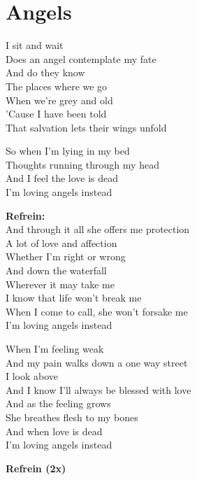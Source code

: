 \section{Angels}
I sit and wait\\
Does an angel contemplate my fate\\
And do they know\\
The places where we go\\
When we're grey and old\\
'Cause I have been told\\
That salvation lets their wings unfold

So when I'm lying in my bed\\
Thoughts running through my head\\
And I feel the love is dead\\
I'm loving angels instead

\textbf{Refrein:}\\
And through it all she offers me protection\\
A lot of love and affection\\
Whether I'm right or wrong\\
And down the waterfall\\
Wherever it may take me\\
I know that life won't break me\\
When I come to call, she won't forsake me\\
I'm loving angels instead

When I'm feeling weak\\
And my pain walks down a one way street\\
I look above\\
And I know I'll always be blessed with love\\
And as the feeling grows\\
She breathes flesh to my bones\\
And when love is dead\\
I'm loving angels instead

\textbf{Refrein (2x)}

